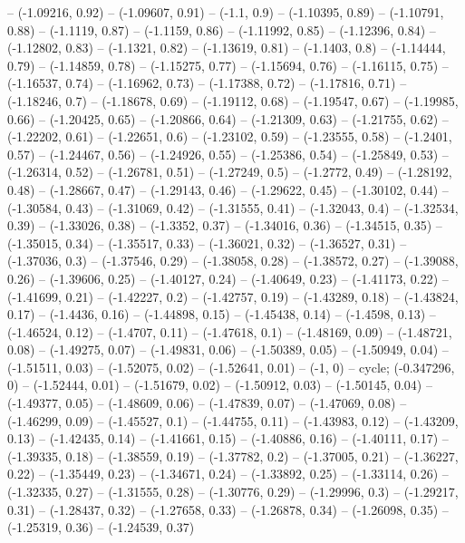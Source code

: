 -- (-1.09216, 0.92)
-- (-1.09607, 0.91)
-- (-1.1, 0.9)
-- (-1.10395, 0.89)
-- (-1.10791, 0.88)
-- (-1.1119, 0.87)
-- (-1.1159, 0.86)
-- (-1.11992, 0.85)
-- (-1.12396, 0.84)
-- (-1.12802, 0.83)
-- (-1.1321, 0.82)
-- (-1.13619, 0.81)
-- (-1.1403, 0.8)
-- (-1.14444, 0.79)
-- (-1.14859, 0.78)
-- (-1.15275, 0.77)
-- (-1.15694, 0.76)
-- (-1.16115, 0.75)
-- (-1.16537, 0.74)
-- (-1.16962, 0.73)
-- (-1.17388, 0.72)
-- (-1.17816, 0.71)
-- (-1.18246, 0.7)
-- (-1.18678, 0.69)
-- (-1.19112, 0.68)
-- (-1.19547, 0.67)
-- (-1.19985, 0.66)
-- (-1.20425, 0.65)
-- (-1.20866, 0.64)
-- (-1.21309, 0.63)
-- (-1.21755, 0.62)
-- (-1.22202, 0.61)
-- (-1.22651, 0.6)
-- (-1.23102, 0.59)
-- (-1.23555, 0.58)
-- (-1.2401, 0.57)
-- (-1.24467, 0.56)
-- (-1.24926, 0.55)
-- (-1.25386, 0.54)
-- (-1.25849, 0.53)
-- (-1.26314, 0.52)
-- (-1.26781, 0.51)
-- (-1.27249, 0.5)
-- (-1.2772, 0.49)
-- (-1.28192, 0.48)
-- (-1.28667, 0.47)
-- (-1.29143, 0.46)
-- (-1.29622, 0.45)
-- (-1.30102, 0.44)
-- (-1.30584, 0.43)
-- (-1.31069, 0.42)
-- (-1.31555, 0.41)
-- (-1.32043, 0.4)
-- (-1.32534, 0.39)
-- (-1.33026, 0.38)
-- (-1.3352, 0.37)
-- (-1.34016, 0.36)
-- (-1.34515, 0.35)
-- (-1.35015, 0.34)
-- (-1.35517, 0.33)
-- (-1.36021, 0.32)
-- (-1.36527, 0.31)
-- (-1.37036, 0.3)
-- (-1.37546, 0.29)
-- (-1.38058, 0.28)
-- (-1.38572, 0.27)
-- (-1.39088, 0.26)
-- (-1.39606, 0.25)
-- (-1.40127, 0.24)
-- (-1.40649, 0.23)
-- (-1.41173, 0.22)
-- (-1.41699, 0.21)
-- (-1.42227, 0.2)
-- (-1.42757, 0.19)
-- (-1.43289, 0.18)
-- (-1.43824, 0.17)
-- (-1.4436, 0.16)
-- (-1.44898, 0.15)
-- (-1.45438, 0.14)
-- (-1.4598, 0.13)
-- (-1.46524, 0.12)
-- (-1.4707, 0.11)
-- (-1.47618, 0.1)
-- (-1.48169, 0.09)
-- (-1.48721, 0.08)
-- (-1.49275, 0.07)
-- (-1.49831, 0.06)
-- (-1.50389, 0.05)
-- (-1.50949, 0.04)
-- (-1.51511, 0.03)
-- (-1.52075, 0.02)
-- (-1.52641, 0.01)
-- (-1, 0)
-- cycle;
\drawBand (-0.347296, 0)
-- (-1.52444, 0.01)
-- (-1.51679, 0.02)
-- (-1.50912, 0.03)
-- (-1.50145, 0.04)
-- (-1.49377, 0.05)
-- (-1.48609, 0.06)
-- (-1.47839, 0.07)
-- (-1.47069, 0.08)
-- (-1.46299, 0.09)
-- (-1.45527, 0.1)
-- (-1.44755, 0.11)
-- (-1.43983, 0.12)
-- (-1.43209, 0.13)
-- (-1.42435, 0.14)
-- (-1.41661, 0.15)
-- (-1.40886, 0.16)
-- (-1.40111, 0.17)
-- (-1.39335, 0.18)
-- (-1.38559, 0.19)
-- (-1.37782, 0.2)
-- (-1.37005, 0.21)
-- (-1.36227, 0.22)
-- (-1.35449, 0.23)
-- (-1.34671, 0.24)
-- (-1.33892, 0.25)
-- (-1.33114, 0.26)
-- (-1.32335, 0.27)
-- (-1.31555, 0.28)
-- (-1.30776, 0.29)
-- (-1.29996, 0.3)
-- (-1.29217, 0.31)
-- (-1.28437, 0.32)
-- (-1.27658, 0.33)
-- (-1.26878, 0.34)
-- (-1.26098, 0.35)
-- (-1.25319, 0.36)
-- (-1.24539, 0.37)
